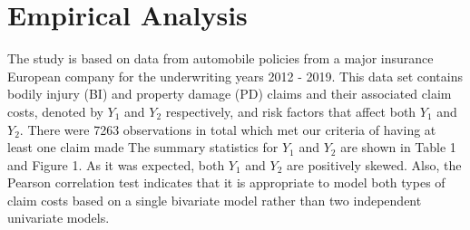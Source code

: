 \documentclass[12pt]{article}%
\theoremstyle{definition}
\theoremstyle{remark}
\begin{document}
{\begin{itemize}
\end{itemize}  
\pagebreak

\section{ Empirical Analysis}
The study is based on data from automobile policies from a major insurance European 
company for the underwriting years 2012 - 2019. This data set contains bodily injury (BI) 
and property damage (PD) claims and their associated claim costs, denoted by $Y_1$ and 
$Y_2$ respectively, and risk factors that affect both $Y_1$ and $Y_2$. There were 7263 observations in total which met our criteria of having at least one claim made
The summary statistics for $Y_1$ and $Y_2$ are shown in Table 1 and Figure 1. As it was 
expected, both $Y_1$ and $Y_2$ are positively skewed. Also, the Pearson correlation test indicates 
that it is appropriate to model both types of claim costs based on a single bivariate model 
rather than two independent univariate models.\\


}
\end{document}
